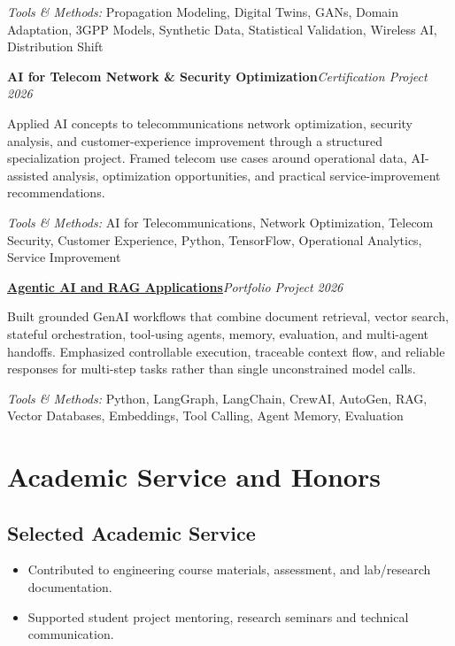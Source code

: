 \documentclass[9pt,letterpaper]{extarticle}
\newcommand{\entry}[2]{\Needspace{4\baselineskip}\textbf{#1}\hfill\textit{#2}\par}
\begin{document}
{\small\textit{Tools \& Methods:} Propagation Modeling, Digital Twins, GANs, Domain Adaptation, 3GPP Models, Synthetic Data, Statistical Validation, Wireless AI, Distribution Shift\par}
\vspace{1pt}
\entry{AI for Telecom Network \& Security Optimization}{Certification Project \textbar{} 2026}
Applied AI concepts to telecommunications network optimization, security analysis, and customer-experience improvement through a structured specialization project. Framed telecom use cases around operational data, AI-assisted analysis, optimization opportunities, and practical service-improvement recommendations.\par
{\small\textit{Tools \& Methods:} AI for Telecommunications, Network Optimization, Telecom Security, Customer Experience, Python, TensorFlow, Operational Analytics, Service Improvement\par}
\vspace{1pt}
\entry{\href{https://github.com/WaseemRaza844/agentic-ai-projects-by-was}{Agentic AI and RAG Applications}}{Portfolio Project \textbar{} 2026}
Built grounded GenAI workflows that combine document retrieval, vector search, stateful orchestration, tool-using agents, memory, evaluation, and multi-agent handoffs. Emphasized controllable execution, traceable context flow, and reliable responses for multi-step tasks rather than single unconstrained model calls.\par
{\small\textit{Tools \& Methods:} Python, LangGraph, LangChain, CrewAI, AutoGen, RAG, Vector Databases, Embeddings, Tool Calling, Agent Memory, Evaluation\par}
\vspace{1pt}
\section{Academic Service and Honors}
\subsection{Selected Academic Service}
\begin{itemize}
\item Contributed to engineering course materials, assessment, and lab/research documentation.
\item Supported student project mentoring, research seminars and technical communication.
\end{itemize}
\end{document}
